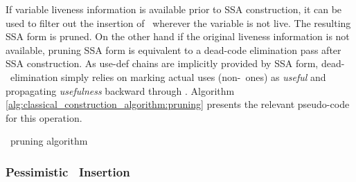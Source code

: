 If variable liveness information is available prior
to SSA construction, it can be used to filter out the 
insertion of \phiops\ wherever the variable is not live.
The resulting SSA form is pruned.
On the other hand
if the original liveness information is not available, 
pruning SSA form is equivalent to a dead-code elimination pass
after SSA construction.
As use-def chains are implicitly provided by SSA form, 
dead-\phiop\ elimination simply relies on marking actual uses 
(non-\phiop\ ones) as \emph{useful} and propagating 
\emph{usefulness} backward through \phiops.
Algorithm \ref{alg:classical_construction_algorithm:pruning} 
presents the relevant pseudo-code for this operation.

\begin{algorithm}
\caption{\label{alg:classical_construction_algorithm:pruning}
\phiop\ pruning algorithm
}
\end{algorithm}

\subsubsection*{Pessimistic \phiop\ Insertion}

